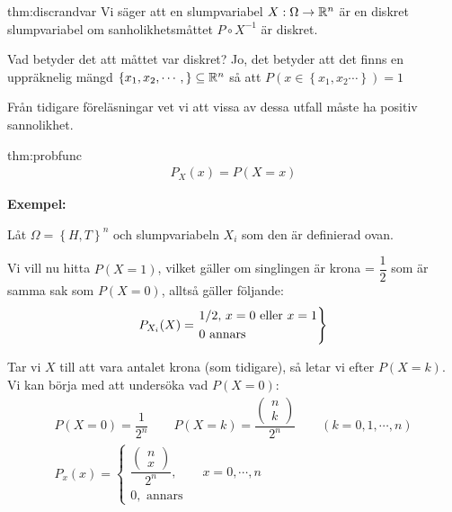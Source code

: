 \par\bigskip
\begin{theo}{thm:discrandvar}
  Vi säger att en slumpvariabel $X:\Omega\to\mathbb{R}^n$ är en diskret slumpvariabel om sanholikhetsmåttet $P\circ X^{-1}$ är diskret.
\end{theo}
\par\bigskip
\noindent Vad betyder det att måttet var diskret? Jo, det betyder att det finns en uppräknelig mängd $\left\{x_1,x_2,\cdots,\right\}\subseteq\mathbb{R}^n$ så att $P(x\in\left\{x_1,x_2\cdots\right\})=1$\par
\noindent Från tidigare föreläsningar vet vi att vissa av dessa utfall måste ha positiv sannolikhet.
\par\bigskip
\begin{theo}[Sannolikhetsfunktionen]{thm:probfunc}
  \begin{equation*}
    \begin{gathered}
      P_X(x) = P(X=x)
    \end{gathered}
  \end{equation*}
\end{theo}
\par\bigskip
\noindent\textbf{Exempel:}\par
\noindent Låt $\Omega = \left\{H,T\right\}^n$ och slumpvariabeln $X_i$ som den är definierad ovan.\par
\noindent Vi vill nu hitta $P(X=1)$, vilket gäller om singlingen är krona = $\dfrac{1}{2}$ som är samma sak som $P(X=0)$, alltså gäller följande:
\begin{equation*}
  \begin{gathered}
    P_{X_i}(X)=
    \begin{rcases*}
      1/2\text{, $x=0$ eller $x=1$}\\
      0\text{ annars}
    \end{rcases*}
  \end{gathered}
\end{equation*}
\par\bigskip
\noindent Tar vi $X$ till att vara antalet krona (som tidigare), så letar vi efter $P(X=k)$. Vi kan börja med att undersöka vad $P(X=0)$:
\begin{equation*}
  \begin{gathered}
    P(X=0)=\dfrac{1}{2^n}\qquad P(X=k) = \dfrac{\begin{pmatrix}n\\k\end{pmatrix}}{2^n}\qquad (k=0,1,\cdots, n)\\
    P_x(x) = 
    \begin{cases*}
      \dfrac{\begin{pmatrix}n\\x\end{pmatrix}}{2^n},\qquad x= 0,\cdots,n\\
      0,\text{ annars}
    \end{cases*}
  \end{gathered}
\end{equation*}
